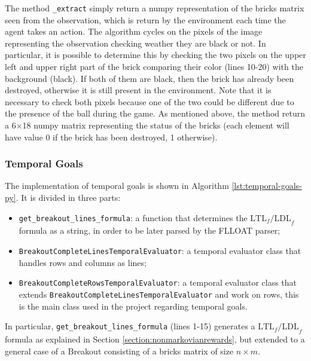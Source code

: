 The method \texttt{\_extract} simply return a numpy representation of the
bricks matrix seen from the observation, which is return by the environment
each time the agent takes an action. The algorithm cycles on the pixels
of the image representing the observation checking weather they are black
or not. In particular, it is possible to determine this by checking the two
pixels on the upper left and upper right part of the brick comparing their
color (lines 10-20) with the background (black). If both of them are black, then the brick
has already been destroyed, otherwise it is still present in the environment.
Note that it is necessary to check both pixels because one of the two could
be different due to the presence of the ball during the game. As mentioned
above, the method return a 6$\times$18 numpy matrix representing the status of
the bricks (each element will have value 0 if the brick has been destroyed,
1 otherwise).


\subsubsection{Temporal Goals}
The implementation of temporal goals is shown in Algorithm
\ref{lst:temporal-goals-py}. It is divided in three parts:
\begin{itemize}
    \item \texttt{get_breakout_lines_formula}: a function that determines the
        $\text{LTL}_f\text{/LDL}_f$ formula as a string, in order to be
        later parsed by the FLLOAT parser;
    \item \texttt{BreakoutCompleteLinesTemporalEvaluator}: a
        temporal evaluator class that handles rows and columns as lines;
    \item \texttt{BreakoutCompleteRowsTemporalEvaluator}: a temporal evaluator
        class that extends \texttt{BreakoutCompleteLinesTemporalEvaluator} and
        work on rows, this is the main class used in the project regarding
        temporal goals.
\end{itemize}

In particular, \texttt{get_breakout_lines_formula} (lines 1-15) generates a
$\text{LTL}_f\text{/LDL}_f$ formula as explained in Section
\ref{section:nonmarkovianrewards}, but extended to a general case of a Breakout
consisting of a bricks matrix of size $n \times m$.

